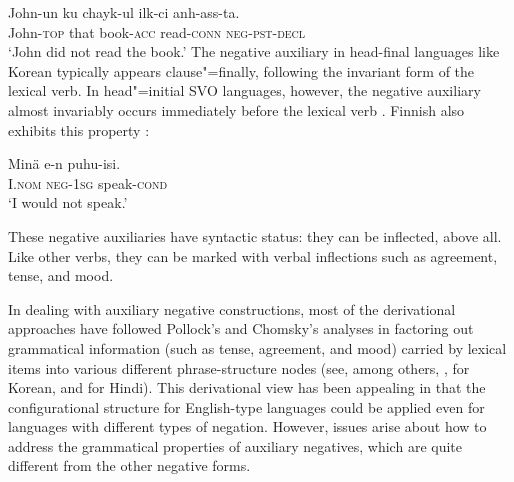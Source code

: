 \documentclass[output=paper
                ,modfonts
                ,nonflat
	        ,collection
	        ,collectionchapter
	        ,collectiontoclongg
 	        ,biblatex
                ,babelshorthands
                ,newtxmath
                ,draftmode
                ,colorlinks, citecolor=brown
]{./langsci/langscibook}
\begin{document}
{\begin{exe}
\begin{xlist}
\begin{exe}
\begin{xlist}
\ea
\gll John-un ku chayk-ul ilk-ci anh-ass-ta. \\
     John-\textsc{top} that book-\textsc{acc} read-\textsc{conn} \textsc{neg}-\textsc{pst}-\textsc{decl}  \\
\glt `John did not read the book.'
\z
%
%
\noindent
The negative auxiliary in head-final languages like Korean
typically appears clause"=finally, following the invariant form of the lexical verb.
In head"=initial SVO languages, however, the negative auxiliary
almost invariably occurs immediately before the lexical verb
\citep{Payne:85}. Finnish also exhibits this property \citep{Mitchell:91}:

\ea
\gll Min\"{a} e-n puhu-isi. \\
     I.\textsc{nom} \textsc{neg}-\textsc{1sg} speak-\textsc{cond} \\
\glt `I would not speak.'
\z

\noindent
These negative auxiliaries have syntactic status: they can be
inflected, above all. Like other verbs, they can be marked
with verbal inflections such as agreement, tense, and mood.

In dealing with auxiliary negative constructions,
most of the derivational approaches have
followed Pollock's and Chomsky's analyses in factoring out grammatical
information (such as tense, agreement, and mood) carried by lexical items into various different phrase-structure nodes (see, among others, \citealt{Hagstrom:02}, \citealt{Han:07} for Korean, and \citealt{Vasishth:00} for Hindi).
This derivational view has
been appealing in that the configurational structure for English-type
languages could be applied even for languages with different types
of negation. However, issues arise about how to address the grammatical
properties of auxiliary negatives, which are quite different from the
other negative forms.
%
%
%
%

%



\end{xlist}
\end{exe}
\end{xlist}
\end{exe}}
\end{document}
